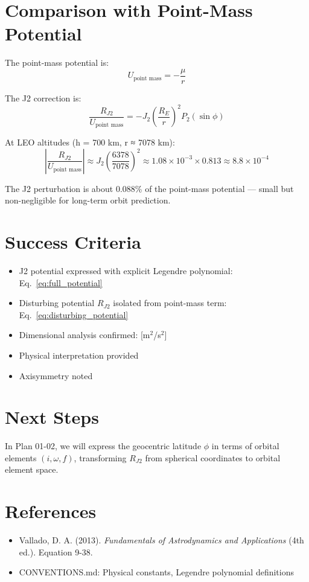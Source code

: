 \documentclass[11pt]{article}
\begin{document}
\section{Comparison with Point-Mass Potential}

The point-mass potential is:
\begin{equation}
U_{\text{point mass}} = -\frac{\mu}{r}
\end{equation}

The J2 correction is:
\begin{equation}
\frac{R_{J2}}{U_{\text{point mass}}} = -J_2\left(\frac{R_E}{r}\right)^2 P_2(\sin \phi)
\end{equation}

At LEO altitudes (h = 700 km, r ≈ 7078 km):
\begin{equation}
\left|\frac{R_{J2}}{U_{\text{point mass}}}\right| \approx J_2\left(\frac{6378}{7078}\right)^2 \approx 1.08 \times 10^{-3} \times 0.813 \approx 8.8 \times 10^{-4}
\end{equation}

The J2 perturbation is about 0.088\% of the point-mass potential — small but non-negligible for long-term orbit prediction.

\section{Success Criteria}

\begin{itemize}
    \item[$\checkmark$] J2 potential expressed with explicit Legendre polynomial: Eq.~\eqref{eq:full_potential}
    \item[$\checkmark$] Disturbing potential $R_{J2}$ isolated from point-mass term: Eq.~\eqref{eq:disturbing_potential}
    \item[$\checkmark$] Dimensional analysis confirmed: [m$^2$/s$^2$]
    \item[$\checkmark$] Physical interpretation provided
    \item[$\checkmark$] Axisymmetry noted
\end{itemize}

\section{Next Steps}

In Plan 01-02, we will express the geocentric latitude $\phi$ in terms of orbital elements $(i, \omega, f)$, transforming $R_{J2}$ from spherical coordinates to orbital element space.

\section{References}

\begin{itemize}
    \item Vallado, D. A. (2013). \textit{Fundamentals of Astrodynamics and Applications} (4th ed.). Equation 9-38.
    \item CONVENTIONS.md: Physical constants, Legendre polynomial definitions
\end{itemize}
\end{document}
